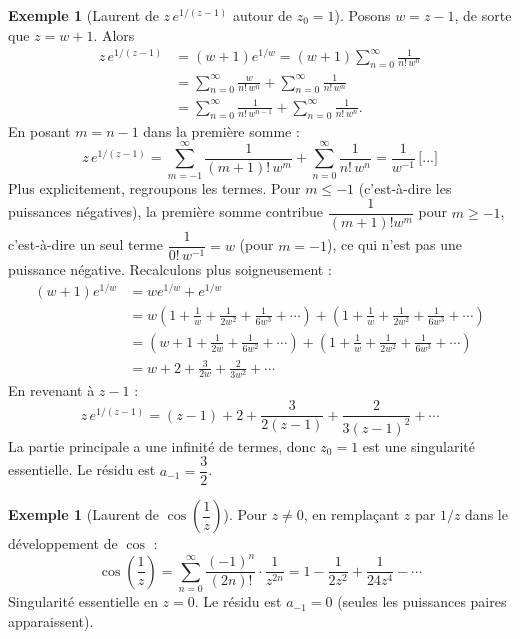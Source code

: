 \documentclass[12pt,a4paper,openany]{book}
\theoremstyle{definition}
\newtheorem{exemple}[definition]{Exemple}
\theoremstyle{plain}
\theoremstyle{remark}
\begin{document}
\begin{exemple}[Laurent de $z\,e^{1/(z-1)}$ autour de $z_0 = 1$]\label{ex:laurent-ze1/(z-1)}
Posons $w = z - 1$, de sorte que $z = w + 1$. Alors
\begin{align*}
  z\,e^{1/(z-1)} &= (w+1)e^{1/w}
  = (w+1)\sum_{n=0}^{\infty}\frac{1}{n!\,w^n} \\
  &= \sum_{n=0}^{\infty}\frac{w}{n!\,w^n}
     + \sum_{n=0}^{\infty}\frac{1}{n!\,w^n} \\
  &= \sum_{n=0}^{\infty}\frac{1}{n!\,w^{n-1}}
     + \sum_{n=0}^{\infty}\frac{1}{n!\,w^n}.
\end{align*}
En posant $m = n - 1$ dans la première somme :
\[
  z\,e^{1/(z-1)} = \sum_{m=-1}^{\infty}\frac{1}{(m+1)!\,w^m}
  + \sum_{n=0}^{\infty}\frac{1}{n!\,w^n}
  = \frac{1}{w^{-1}}\,\text{[...]}
\]
Plus explicitement, regroupons les termes. Pour $m \leq -1$ (c'est-à-dire
les puissances négatives), la première somme contribue
$\dfrac{1}{(m+1)!w^m}$ pour $m \geq -1$, c'est-à-dire un seul terme
$\dfrac{1}{0!\,w^{-1}} = w$ (pour $m = -1$), ce qui n'est pas une
puissance négative. Recalculons plus soigneusement :
\begin{align*}
  (w+1)e^{1/w} &= we^{1/w} + e^{1/w} \\
  &= w\left(1 + \frac{1}{w} + \frac{1}{2w^2} + \frac{1}{6w^3}+\cdots\right)
   + \left(1 + \frac{1}{w} + \frac{1}{2w^2} + \frac{1}{6w^3}+\cdots\right) \\
  &= \left(w + 1 + \frac{1}{2w} + \frac{1}{6w^2} + \cdots\right)
   + \left(1 + \frac{1}{w} + \frac{1}{2w^2} + \frac{1}{6w^3} + \cdots\right) \\
  &= w + 2 + \frac{3}{2w} + \frac{2}{3w^2} + \cdots
\end{align*}
En revenant à $z - 1$ :
\[
  z\,e^{1/(z-1)} = (z-1) + 2 + \frac{3}{2(z-1)} + \frac{2}{3(z-1)^2} + \cdots
\]
La partie principale a une infinité de termes, donc $z_0 = 1$ est une
singularité essentielle. Le résidu est $a_{-1} = \dfrac{3}{2}$.
\end{exemple}

\begin{exemple}[Laurent de $\cos\!\left(\dfrac{1}{z}\right)$]\label{ex:laurent-cos1/z}
Pour $z \neq 0$, en remplaçant $z$ par $1/z$ dans le développement de
$\cos$ :
\[
  \cos\!\left(\frac{1}{z}\right) = \sum_{n=0}^{\infty}
  \frac{(-1)^n}{(2n)!}\cdot\frac{1}{z^{2n}}
  = 1 - \frac{1}{2z^2} + \frac{1}{24z^4} - \cdots
\]
Singularité essentielle en $z = 0$. Le résidu est $a_{-1} = 0$
(seules les puissances paires apparaissent).
\end{exemple}
\end{document}

